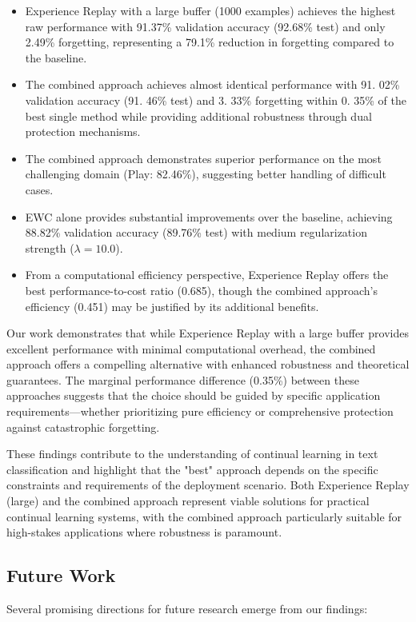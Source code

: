 \documentclass[conference]{IEEEtran}
\begin{document}
\begin{itemize}
    \item Experience Replay with a large buffer (1000 examples) achieves the highest raw performance with 91.37\% validation accuracy (92.68\% test) and only 2.49\% forgetting, representing a 79.1\% reduction in forgetting compared to the baseline.
    \item The combined approach achieves almost identical performance with 91. 02\% validation accuracy (91. 46\% test) and 3. 33\% forgetting within 0. 35\% of the best single method while providing additional robustness through dual protection mechanisms.
    \item The combined approach demonstrates superior performance on the most challenging domain (Play: 82.46\%), suggesting better handling of difficult cases.
    \item EWC alone provides substantial improvements over the baseline, achieving 88.82\% validation accuracy (89.76\% test) with medium regularization strength ($\lambda=10.0$).
    \item From a computational efficiency perspective, Experience Replay offers the best performance-to-cost ratio (0.685), though the combined approach's efficiency (0.451) may be justified by its additional benefits.
\end{itemize}

Our work demonstrates that while Experience Replay with a large buffer provides excellent performance with minimal computational overhead, the combined approach offers a compelling alternative with enhanced robustness and theoretical guarantees. The marginal performance difference (0.35\%) between these approaches suggests that the choice should be guided by specific application requirements—whether prioritizing pure efficiency or comprehensive protection against catastrophic forgetting.

These findings contribute to the understanding of continual learning in text classification and highlight that the "best" approach depends on the specific constraints and requirements of the deployment scenario. Both Experience Replay (large) and the combined approach represent viable solutions for practical continual learning systems, with the combined approach particularly suitable for high-stakes applications where robustness is paramount.

\subsection{Future Work}
Several promising directions for future research emerge from our findings:
\end{document}

